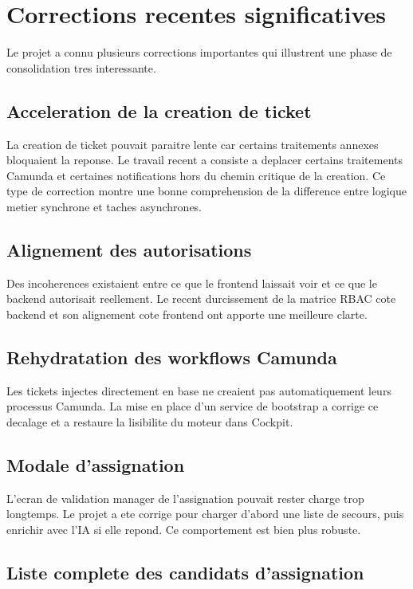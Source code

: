 \documentclass[12pt,a4paper,oneside]{report}
\begin{document}
\section{Corrections recentes significatives}

Le projet a connu plusieurs corrections importantes qui illustrent une phase de consolidation tres interessante.

\subsection{Acceleration de la creation de ticket}

La creation de ticket pouvait paraitre lente car certains traitements annexes bloquaient la reponse. Le travail recent a consiste a deplacer certains traitements Camunda et certaines notifications hors du chemin critique de la creation. Ce type de correction montre une bonne comprehension de la difference entre logique metier synchrone et taches asynchrones.

\subsection{Alignement des autorisations}

Des incoherences existaient entre ce que le frontend laissait voir et ce que le backend autorisait reellement. Le recent durcissement de la matrice RBAC cote backend et son alignement cote frontend ont apporte une meilleure clarte.

\subsection{Rehydratation des workflows Camunda}

Les tickets injectes directement en base ne creaient pas automatiquement leurs processus Camunda. La mise en place d'un service de bootstrap a corrige ce decalage et a restaure la lisibilite du moteur dans Cockpit.

\subsection{Modale d'assignation}

L'ecran de validation manager de l'assignation pouvait rester charge trop longtemps. Le projet a ete corrige pour charger d'abord une liste de secours, puis enrichir avec l'IA si elle repond. Ce comportement est bien plus robuste.

\subsection{Liste complete des candidats d'assignation}
\end{document}
